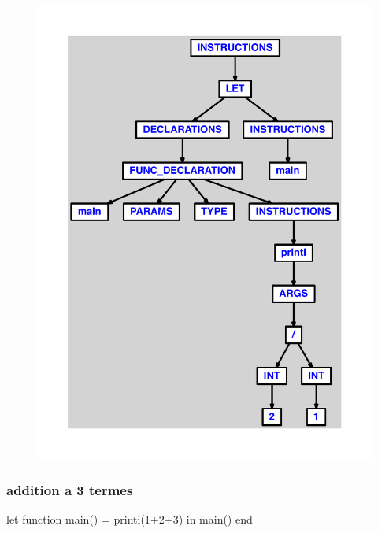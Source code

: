 \documentclass{article}
\begin{document}
\begin{figure}[H]\centering\includegraphics[max width=\textwidth]{ast/ast_42.pdf}\end{figure}\subsubsection{addition a 3 termes}
\begin{verbatimtab}
let
	function main() = printi(1+2+3)
in main() end
\end{verbatimtab}
\end{document}
